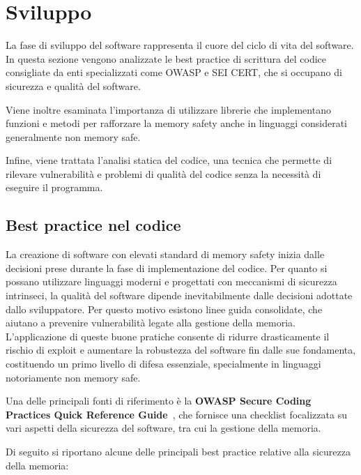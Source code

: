 \section{Sviluppo}
\label{sec:development}

La fase di sviluppo del software rappresenta il cuore del ciclo di vita del software.
In questa sezione vengono analizzate le best practice di scrittura del codice
consigliate da enti specializzati come OWASP e SEI CERT, che si occupano di sicurezza
e qualità del software.

Viene inoltre esaminata l'importanza di utilizzare librerie che implementano funzioni
e metodi per rafforzare la memory safety anche in linguaggi considerati generalmente
non memory safe.

Infine, viene trattata l'analisi statica del codice, una tecnica che permette di
rilevare vulnerabilità e problemi di qualità del codice senza la necessità di eseguire
il programma.

\subsection{Best practice nel codice}
\label{sec:best-practices-codice}

La creazione di software con elevati standard di memory safety inizia dalle
decisioni prese durante la fase di implementazione del codice. Per quanto si possano
utilizzare linguaggi moderni e progettati con meccanismi di sicurezza intrinseci,
la qualità del software dipende inevitabilmente dalle decisioni adottate dallo
sviluppatore. Per questo motivo esistono linee guida consolidate, che aiutano a
prevenire vulnerabilità legate alla gestione della memoria. L'applicazione di queste
buone pratiche consente di ridurre drasticamente il rischio di exploit e aumentare
la robustezza del software fin dalle sue fondamenta, costituendo un primo
livello di difesa essenziale, specialmente in linguaggi notoriamente non memory safe.

Una delle principali fonti di riferimento è la \textbf{OWASP Secure Coding
Practices Quick Reference Guide}~\cite{owasp_best_practices}, che fornisce una checklist
focalizzata su vari aspetti della sicurezza del software, tra cui la gestione
della memoria.

Di seguito si riportano alcune delle principali best practice relative alla
sicurezza della memoria:


